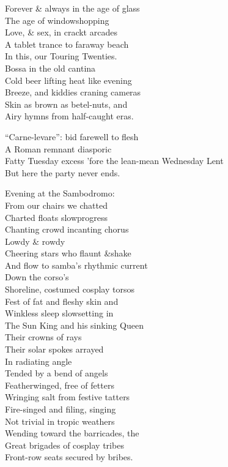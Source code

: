 \secdiv

Forever \& always in the age of glass \\
The age of windowshopping \\
Love, \& sex, in crackt arcades \\
A tablet trance to faraway beach \\
In this, our Touring Twenties. \\

Bossa in the old cantina \\
Cold beer lifting heat like evening \\
Breeze, and kiddies craning cameras \\
Skin as brown as betel-nuts, and \\
Airy hymns from half-caught eras.

\secdiv

``Carne-levare'': bid farewell to flesh \\
A Roman remnant diasporic \\
Fatty Tuesday excess 'fore the lean-mean Wednesday Lent \\
But here the party never ends.

Evening at the Sambodromo: \\
From our chairs we chatted \\
Charted floats slowprogress \\
Chanting crowd incanting chorus \\
Lowdy \& rowdy \\
Cheering stars who flaunt \&shake \\
And flow to samba's rhythmic current \\
Down the corso's \\
Shoreline, costumed cosplay torsos \\
Fest of fat and fleshy skin and \\
Winkless sleep slowsetting in \\
The Sun King and his sinking Queen \\
Their crowns of rays \\
Their solar spokes arrayed \\
In radiating angle \\
Tended by a bend of angels \\
Featherwinged, free of fetters \\
Wringing salt from festive tatters \\
Fire-singed and filing, singing \\
Not trivial in tropic weathers \\
Wending toward the barricades, the \\
Great brigades of cosplay tribes \\
Front-row seats secured by bribes.

